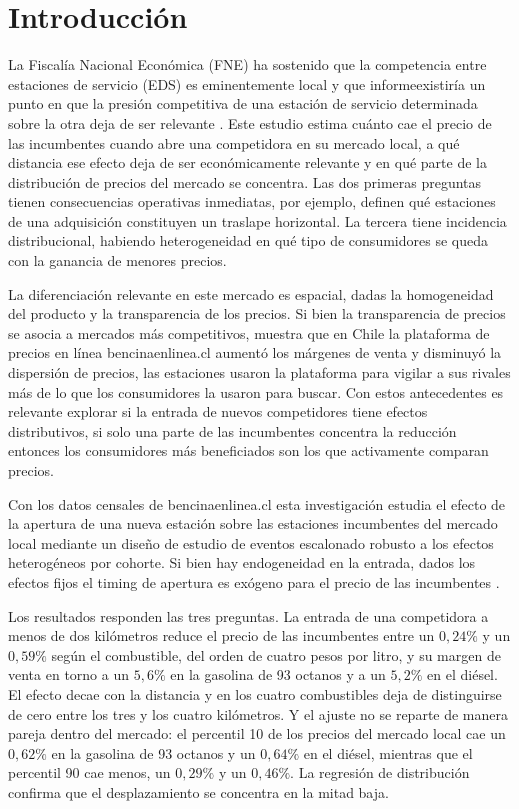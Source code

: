 \section{Introducción}

La Fiscalía Nacional Económica (FNE) ha sostenido que la competencia entre estaciones de servicio (EDS) es eminentemente local y que informeexistiría un punto en que la presión competitiva de una estación de servicio determinada sobre la otra deja de ser relevante \parencite{FNE2021informe}. Este estudio estima cuánto cae el precio de las incumbentes cuando abre una competidora en su mercado local, a qué distancia ese efecto deja de ser económicamente relevante y en qué parte de la distribución de precios del mercado se concentra. Las dos primeras preguntas tienen consecuencias operativas inmediatas, por ejemplo, definen qué estaciones de una adquisición constituyen un traslape horizontal. La tercera tiene incidencia distribucional, habiendo heterogeneidad en qué tipo de consumidores se queda con la ganancia de menores precios.

La diferenciación relevante en este mercado es espacial, dadas la homogeneidad del producto y la transparencia de los precios. Si bien la transparencia de precios se asocia a mercados más competitivos, \textcite{LUCO2019} muestra que en Chile la plataforma de precios en línea bencinaenlinea.cl aumentó los márgenes de venta y disminuyó la dispersión de precios, las estaciones usaron la plataforma para vigilar a sus rivales más de lo que los consumidores la usaron para buscar. Con estos antecedentes es relevante explorar si la entrada de nuevos competidores tiene efectos distributivos, si solo una parte de las incumbentes concentra la reducción entonces los consumidores más beneficiados son los que activamente comparan precios.

Con los datos censales de bencinaenlinea.cl esta investigación estudia el efecto de la apertura de una nueva estación sobre las estaciones incumbentes del mercado local mediante un diseño de estudio de eventos escalonado robusto a los efectos heterogéneos por cohorte. Si bien hay endogeneidad en la entrada, dados los efectos fijos el timing de apertura es exógeno para el precio de las incumbentes \parencite{ARCIDIACONO2020,FISCHER2025}. 

Los resultados responden las tres preguntas. La entrada de una competidora a menos de dos kilómetros reduce el precio de las incumbentes entre un $0{,}24\%$ y un $0{,}59\%$ según el combustible, del orden de cuatro pesos por litro, y su margen de venta en torno a un $5{,}6\%$ en la gasolina de 93 octanos y a un $5{,}2\%$ en el diésel. El efecto decae con la distancia y en los cuatro combustibles deja de distinguirse de cero entre los tres y los cuatro kilómetros. Y el ajuste no se reparte de manera pareja dentro del mercado: el percentil 10 de los precios del mercado local cae un $0{,}62\%$ en la gasolina de 93 octanos y un $0{,}64\%$ en el diésel, mientras que el percentil 90 cae menos, un $0{,}29\%$ y un $0{,}46\%$. La regresión de distribución confirma que el desplazamiento se concentra en la mitad baja. 

